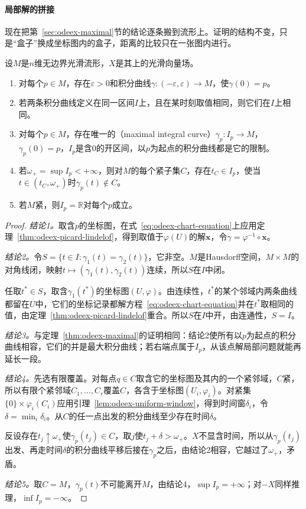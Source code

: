 \paragraph{局部解的拼接}
现在把第~\ref{sec:odeex-maximal}节的结论逐条搬到流形上。证明的结构不变，只是“盒子”换成坐标图内的盒子，距离的比较只在一张图内进行。

\begin{theorem}[积分曲线]
\label{thm:odeex-manifold}
设$M$是$n$维无边界光滑流形，$X$是其上的光滑向量场。
\begin{enumerate}
 \item 对每个$p\in M$，存在$\varepsilon>0$和积分曲线$\gamma:(-\varepsilon,\varepsilon)\to M$，使$\gamma(0)=p$。
 \item 若两条积分曲线定义在同一区间$I$上，且在某时刻取值相同，则它们在$I$上相同。
 \item 对每个$p\in M$，存在唯一的（maximal integral curve）$\gamma_p:I_p\to M$，$\gamma_p(0)=p$，$I_p$是含$0$的开区间，以$p$为起点的积分曲线都是它的限制。
 \item 若$\omega_+=\sup I_p<+\infty$，则对$M$的每个紧子集$C$，存在$t_C\in I_p$，使当$t\in(t_C,\omega_+)$时$\gamma_p(t)\notin C$。
 \item 若$M$紧，则$I_p=\mathbb{R}$对每个$p$成立。
\end{enumerate}
\end{theorem}

\begin{proof}
\emph{结论1。}取含$p$的坐标图，在式~\eqref{eq:odeex-chart-equation}上应用定理~\ref{thm:odeex-picard-lindelof}，得到取值于$\varphi(U)$的解$\bm{x}$，令$\gamma=\varphi^{-1}\circ\bm{x}$。

\emph{结论2。}令$S=\{t\in I:\gamma_1(t)=\gamma_2(t)\}$，它非空。$M$是Hausdorff空间，$M\times M$的对角线闭，映射$t\mapsto(\gamma_1(t),\gamma_2(t))$连续，所以$S$在$I$中闭。

任取$t^\ast\in S$，取含$\gamma_1(t^\ast)$的坐标图$(U,\varphi)$。由连续性，$t^\ast$的某个邻域内两条曲线都留在$U$中，它们的坐标记录都解方程~\eqref{eq:odeex-chart-equation}并在$t^\ast$取相同的值，由定理~\ref{thm:odeex-picard-lindelof}重合。所以$S$在$I$中开，由连通性，$S=I$。

\emph{结论3。}与定理~\ref{thm:odeex-maximal}的证明相同：结论2使所有以$p$为起点的积分曲线相容，它们的并是最大积分曲线；若右端点属于$I_p$，从该点解局部问题就能再延长一段。

\emph{结论4。}先选有限覆盖。对每点$q\in C$取含它的坐标图及其内的一个紧邻域，$C$紧，所以有限个紧邻域$C_1,\ldots,C_r$覆盖$C$，各含于坐标图$(U_i,\varphi_i)$。对紧集$\{0\}\times\varphi_i(C_i)$应用引理~\ref{lem:odeex-uniform-window}，得到时间窗$\delta_i$，令$\delta=\min_i\delta_i$。从$C$的任一点出发的积分曲线至少存在时间$\delta$。

反设存在$t_j\uparrow\omega_+$使$\gamma_p(t_j)\in C$，取$j$使$t_j+\delta>\omega_+$。$X$不显含时间，所以从$\gamma_p(t_j)$出发、再走时间$\delta$的积分曲线平移后接在$\gamma_p$之后，由结论2相容，它越过了$\omega_+$，矛盾。

\emph{结论5。}取$C=M$，$\gamma_p(t)$不可能离开$M$，由结论4，$\sup I_p=+\infty$；对$-X$同样推理，$\inf I_p=-\infty$。
\end{proof}

